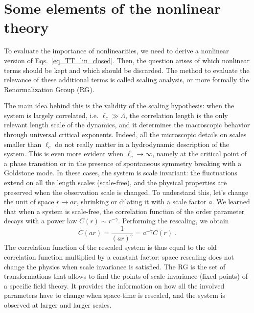 \section{Some elements of the nonlinear theory}

To evaluate the importance of nonlinearities, we need to derive a nonlinear version of Eqs.~\eqref{eq_TT_lin_closed}.
Then, the question arises of which nonlinear terms should be kept and which should be discarded. The method to evaluate the relevance of these additional terms is called scaling analysis, or more formally the Renormalization Group (RG). 

The main idea behind this is the validity of the scaling hypothesis: when the system is largely correlated, i.e. $\ell_c \gg \Lambda$, the correlation length is the only relevant length scale of the dynamics, and it determines the macroscopic behavior through universal critical exponents. Indeed, all the microscopic details on scales smaller than $\ell_c$ do not really matter in a hydrodynamic description of the system. This is even more evident when $\ell_c \to \infty$, namely at the critical point of a phase transition or in the presence of spontaneous symmetry breaking with a Goldstone mode. In these cases, the system is scale invariant: the fluctuations extend on all the length scales (scale-free), and the physical properties are preserved when the observation scale is changed. To understand this, let's change the unit of space $r \to a r$, shrinking or dilating it with a scale factor $a$. We learned that when a system is scale-free, the correlation function of the order parameter decays with a power law $C(r) \sim r^{-\gamma}$. Performing the rescaling, we obtain
$$
C(ar) = \frac{1}{(ar)^{\gamma}} = a^{-\gamma} C(r) \ .
$$
The correlation function of the rescaled system is thus equal to the old correlation function multiplied by a constant factor: space rescaling does not change the physics when scale invariance is satisfied.  The RG is the set of transformations that allows to find the points of scale invariance (fixed points) of a specific field theory. It provides the information on how all the involved parameters have to change when space-time is rescaled, and the system is observed at larger and larger scales. 

